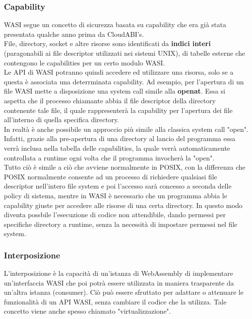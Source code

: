 \subsubsection{Capability}
WASI segue un concetto di sicurezza basata su capability che era già stata presentata qualche anno prima da CloudABI's.
\\File, directory, socket e altre risorse sono identificati da \textbf{indici interi} (paragonabili ai file descriptor utilizzati nei sistemi UNIX), di tabelle esterne che contengono le capabilities per un certo modulo WASI.
\\Le API di WASI potranno quindi accedere ed utilizzare una risorsa, solo se a questa è associata una deterrminata capability.
Ad esempio, per l'apertura di un file WASI mette a disposizione una system call simile alla \textbf{openat}.
Essa si aspetta che il processo chiamante abbia il file descriptor della directory contenente tale file, il quale rappresenterà la capability per l'apertura dei file all'interno di quella specifica directory.
\\In realtà è anche possibile un approccio più simile alla classica system call "open".
Infatti, grazie alla pre-apertura di una directory al lancio del programma essa verrà inclusa nella tabella delle capabilities, la quale verrà automaticamente controllata a runtime ogni volta che il programma invocherà la "open".
\\Tutto ciò è simile a ciò che avviene normalmente in POSIX, con la differenza che POSIX normalmente consente ad un processo di richiedere qualsiasi file descriptor nell'intero file system e poi l'accesso sarà concesso a seconda delle policy di sistema, mentre in WASI è necessario che un programma abbia le capability giuste per accedere alle risorse di una certa directory. In questo modo diventa possbile l'esecuzione di codice non attendibile, dando permessi per specifiche directory a runtime, senza la necessità di impostare permessi nel file system.\cite*{wasi:capabilities}
\subsubsection{Interposizione}
L'interposizione è la capacità di un'istanza di WebAssembly di implementare un'interfaccia WASI che poi potrà essere utilizzata in maniera trasparente da un'altra istanza (consumer).
Ciò può essere sfruttato per adattare o attenuare le funzionalità di un API WASI, senza cambiare il codice che la utilizza.
Tale concetto viene anche spesso chiamato "virtualizzazione".
